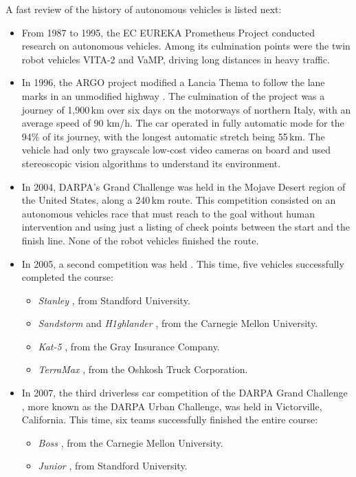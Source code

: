 A fast review of the history of autonomous vehicles is listed next:
\begin{itemize}
\item From 1987 to 1995, the EC EUREKA Prometheus Project conducted research on autonomous vehicles. Among its culmination points were the twin robot vehicles VITA-2 and VaMP, driving long distances in heavy traffic.
\item In 1996, the ARGO project modified a Lancia Thema to follow the lane marks in an unmodified highway \citep{Broggi1999}. The culmination of the project was a journey of 1,900\,km over six days on the motorways of northern Italy, with an average speed of 90 km/h. The car operated in fully automatic mode for the 94\% of its journey, with the longest automatic stretch being 55\,km. The vehicle had only two grayscale low-cost video cameras on board and used stereoscopic vision algorithms to understand its environment. 
 \item In 2004, DARPA's Grand Challenge was held in the Mojave Desert region of the United States, along a 240\,km route. This competition consisted on an autonomous vehicles race that must reach to the goal without human intervention and using just a listing of check points between the start and the finish line. None of the robot vehicles finished the route.
 \item In 2005, a second competition was held \citep{Buehler2007}. This time, five vehicles successfully completed the course:
 \begin{itemize}
  \item \emph{Stanley} \citep{thrun2006stanley}, from Standford University.
  \item \emph{Sandstorm} and \emph{H1ghlander} \citep{urmson2004high}, from the Carnegie Mellon University.
  \item \emph{Kat-5} \citep{trepagnier2006kat}, from the Gray Insurance Company.
  \item \emph{TerraMax} \citep{ozguner2004team}, from the Oshkosh Truck Corporation.
 \end{itemize}
 \item In 2007, the third driverless car competition of the DARPA Grand Challenge \citep{Buehler2009}, more known as the DARPA Urban Challenge, was held in Victorville, California. This time, six teams successfully finished the entire course:
 \begin{itemize}
  \item \emph{Boss} \citep{Urmson2008}, from the Carnegie Mellon University.
  \item \emph{Junior} \citep{montemerlo2008junior}, from Standford University.

\end{itemize}
\end{itemize}
